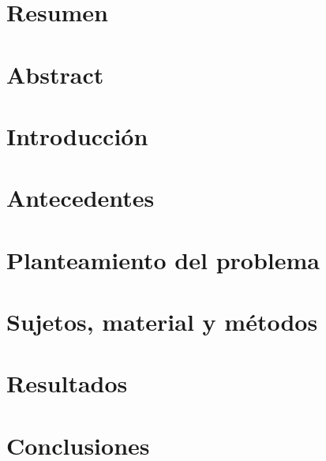 \documentclass[12pt, letterpaper, oneside, openany]{book}
\begin{document}


\pagestyle{empty}
% 




\frontmatter
\pagestyle{plain}
\chapter*{\center Resumen}


\chapter*{\center Abstract}

\tableofcontents

\mainmatter
{}
\newcommand{\hsp}{\hspace{15pt}}
\titleformat{\chapter}[hang]{\Huge\bfseries}{\thechapter\hsp\textcolor{gray42}{\textbar}\hsp}{0pt}{\Huge\bfseries}

\chapter{Introducción}


\chapter{Antecedentes}


\chapter{Planteamiento del problema}


\chapter{Sujetos, material y métodos}


\chapter{Resultados}


\chapter{Conclusiones}


\backmatter
{}
\printbibliography
\listoffigures
\listoftables
\end{document}
